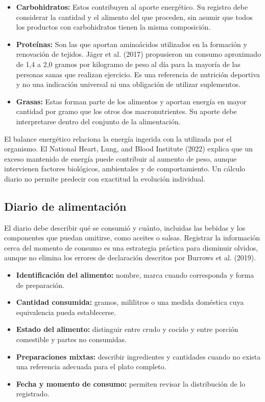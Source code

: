\begin{itemize}
    \item \textbf{Carbohidratos:} Estos contribuyen al aporte energético. Su registro debe considerar la cantidad y el alimento del que proceden, sin asumir que todos los productos con carbohidratos tienen la misma composición.
    \item \textbf{Proteínas:} Son las que aportan aminoácidos utilizados en la formación y renovación de tejidos. Jäger et al. (2017) propusieron un consumo aproximado de 1,4 a 2,0 gramos por kilogramo de peso al día para la mayoría de las personas sanas que realizan ejercicio. Es una referencia de nutrición deportiva y no una indicación universal ni una obligación de utilizar suplementos.
    \item \textbf{Grasas:} Estas forman parte de los alimentos y aportan energía en mayor cantidad por gramo que los otros dos macronutrientes. Su aporte debe interpretarse dentro del conjunto de la alimentación.
\end{itemize}

El balance energético relaciona la energía ingerida con la utilizada por el organismo. El National Heart, Lung, and Blood Institute (2022) explica que un exceso mantenido de energía puede contribuir al aumento de peso, aunque intervienen factores biológicos, ambientales y de comportamiento. Un cálculo diario no permite predecir con exactitud la evolución individual.

\subsection{Diario de alimentación}

El diario debe describir qué se consumió y cuánto, incluidas las bebidas y los componentes que puedan omitirse, como aceites o salsas. Registrar la información cerca del momento de consumo es una estrategia práctica para disminuir olvidos, aunque no elimina los errores de declaración descritos por Burrows et al. (2019).

\begin{itemize}
    \item \textbf{Identificación del alimento:} nombre, marca cuando corresponda y forma de preparación.
    \item \textbf{Cantidad consumida:} gramos, mililitros o una medida doméstica cuya equivalencia pueda establecerse.
    \item \textbf{Estado del alimento:} distinguir entre crudo y cocido y entre porción comestible y partes no consumidas.
    \item \textbf{Preparaciones mixtas:} describir ingredientes y cantidades cuando no exista una referencia adecuada para el plato completo.
    \item \textbf{Fecha y momento de consumo:} permiten revisar la distribución de lo registrado.
\end{itemize}

